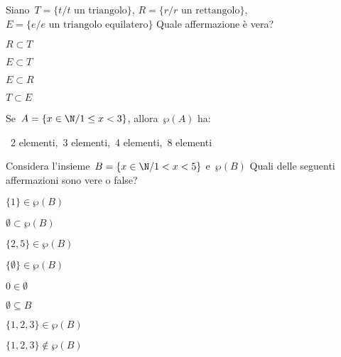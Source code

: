 \begin{esercizio}
\label{ese:7.1}
 Siano~\(T=\{t / t\text{ un triangolo}\}\), \(R=\{r / r\text{ un 
rettangolo}\}\),
\(E=\{e / e\text{ un triangolo equilatero}\}\) Quale affermazione è vera?
\begin{multicols}{4}
\begin{enumeratea}
\item \(R\subset T\)
\item \(E\subset T\)
\item \(E\subset R\)
\item \(T\subset E\)
\end{enumeratea}
\end{multicols}
\end{esercizio}


\begin{esercizio}
\label{ese:7.2}
Se~\(A=\{x\in\N/1\le x<3\}\), allora~\(\wp (A)\) ha:
\begin{center}
\boxA\quad~2 elementi,\quad\boxB\quad~3 elementi,\quad\boxC\quad~4 
elementi,\quad\boxD\quad~8 elementi
\end{center}
\end{esercizio}

\newpage %

\begin{esercizio}
 \label{ese:7.3}
Considera l'insieme~\(B=\{x\in\N/1<x<5\}\)
e~\(\wp (B)\) Quali delle seguenti affermazioni sono vere o false?
\begin{multicols}{2}
\TabPositions{3cm}
\begin{enumeratea}
 \item \(\{1\}\in\wp (B)\) \tab\boxV\quad\boxF
 \item \(\emptyset\subset\wp (B)\) \tab\boxV\quad\boxF
 \item \(\{2,5\}\in\wp (B)\) \tab\boxV\quad\boxF
 \item \(\{\emptyset\}\in\wp (B)\) \tab\boxV\quad\boxF
 \item \(0\in\emptyset \) \tab\boxV\quad\boxF
 \item \(\emptyset\subseteq B\) \tab\boxV\quad\boxF
 \item \(\{1,2,3\}\in\wp (B)\) \tab\boxV\quad\boxF
 \item \(\{1,2,3\}\notin\wp (B)\) \tab\boxV\quad\boxF
\end{enumeratea}
\end{multicols}
\end{esercizio}


